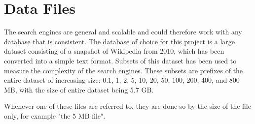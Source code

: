 \section{Data Files}

The search engines are general and scalable and could therefore work with any database that is consistent. The database of choice for this project is a large dataset consisting of a snapshot of Wikipedia from 2010, which has been converted into a simple text format. Subsets of this dataset has been used to measure the complexity of the search engines. These subsets are prefixes of the entire dataset of increasing size: 0.1, 1, 2, 5, 10, 20, 50, 100, 200, 400, and 800 MB, with the size of entire dataset being 5.7 GB. 

Whenever one of these files are referred to, they are done so by the size of the file only, for example "the 5 MB file". 
